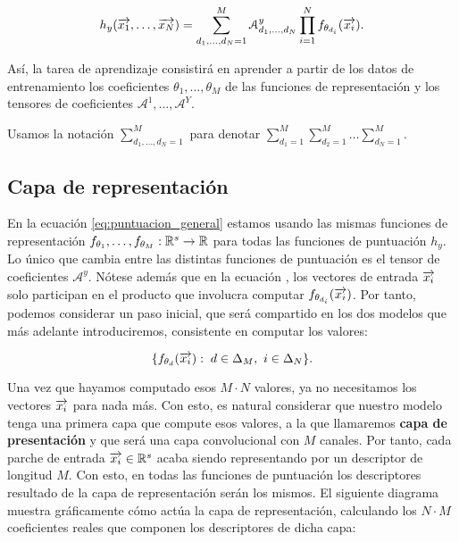 \begin{equation} \label{eq:puntuacion_general}
	h_y(\overrightarrow{x_1}, \ldots, \overrightarrow{x_N}) = \sum_{d_1, \ldots, d_N = 1}^{M} \mathcal{A}^y_{d_1, \ldots, d_N} \prod_{i = 1}^N f_{\theta_{d_i}}(\overrightarrow{x_i}).
\end{equation}

Así, la tarea de aprendizaje consistirá en aprender a partir de los datos de entrenamiento los coeficientes $\theta_1, \ldots, \theta_M$ de las funciones de representación y los tensores de coeficientes $\mathcal{A}^1, \ldots, \mathcal{A}^Y$.

\begin{observacion}
	Usamos la notación $\sum_{d_1, \ldots, d_N = 1}^{M}$ para denotar $\sum_{d_1 = 1}^{M} \sum_{d_2 = 1}^{M} \ldots \sum_{d_N = 1}^{M}$.
\end{observacion}

\subsection{Capa de representación} \label{subs:capa_de_representacion}

En la ecuación \eqref{eq:puntuacion_general} estamos usando las mismas funciones de representación $f_{\theta_1}, \ldots, f_{\theta_M}: \mathbb{R}^s \to \mathbb{R}$ para todas las funciones de puntuación $h_y$. Lo único que cambia entre las distintas funciones de puntuación es el tensor de coeficientes $\mathcal{A}^y$. Nótese además que en la ecuación , los vectores de entrada $\overrightarrow{x_i}$ solo participan en el producto que involucra computar $f_{\theta_{d_i}}(\overrightarrow{x_i})$. Por tanto, podemos considerar un paso inicial, que será compartido en los dos modelos que más adelante introduciremos, consistente en computar los valores:

$$\{f_{\theta_d}(\overrightarrow{x_i}): \; d \in \Delta_{M},\ i \in \Delta_{N} \}.$$

Una vez que hayamos computado esos $M \cdot N$ valores, ya no necesitamos los vectores $\overrightarrow{x_i}$ para nada más. Con esto, es natural considerar que nuestro modelo tenga una primera capa que compute esos valores, a la que llamaremos \textbf{capa de presentación} y que será una capa convolucional con $M$ canales. Por tanto, cada parche de entrada $\overrightarrow{x_i} \in \mathbb{R}^s$ acaba siendo representando por un descriptor de longitud $M$. Con esto, en todas las funciones de puntuación los descriptores resultado de la capa de representación serán los mismos. El siguiente diagrama muestra gráficamente cómo actúa la capa de representación, calculando los $N \cdot M$ coeficientes reales que componen los descriptores de dicha capa:

